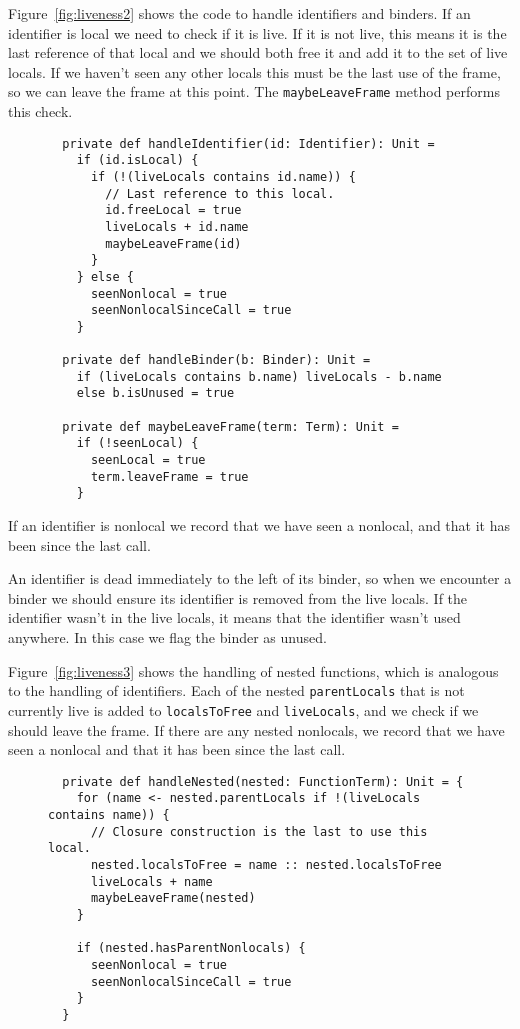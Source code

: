 Figure~\ref{fig:liveness2} shows the code to handle identifiers and binders.
If an identifier is local we need to check if it is live.
If it is not live,
this means it is the last reference of that local and we should
both free it and add it to the set of live locals.
If we haven't seen any other locals this must be the last use of the frame,
so we can leave the frame at this point.
The \verb!maybeLeaveFrame! method performs this check.

\begin{figure}
\begin{verbatim}
  private def handleIdentifier(id: Identifier): Unit =
    if (id.isLocal) {
      if (!(liveLocals contains id.name)) {
        // Last reference to this local.
        id.freeLocal = true
        liveLocals + id.name
        maybeLeaveFrame(id)
      }
    } else {
      seenNonlocal = true
      seenNonlocalSinceCall = true
    }

  private def handleBinder(b: Binder): Unit =
    if (liveLocals contains b.name) liveLocals - b.name
    else b.isUnused = true

  private def maybeLeaveFrame(term: Term): Unit =
    if (!seenLocal) {
      seenLocal = true
      term.leaveFrame = true
    }
\end{verbatim}
\getcaption
\end{figure}

If an identifier is nonlocal we record that we have seen a nonlocal,
and that it has been since the last call.

An identifier is dead immediately to the left of its binder,
so when we encounter a binder we should ensure
its identifier is removed from the live locals.
If the identifier wasn't in the live locals,
it means that the identifier wasn't used anywhere.
In this case we flag the binder as unused.

Figure~\ref{fig:liveness3} shows the handling of nested functions,
which is analogous to the handling of identifiers.
Each of the nested \verb!parentLocals! that is not currently live
is added to \verb!localsToFree! and \verb!liveLocals!,
and we check if we should leave the frame.
If there are any nested nonlocals,
we record that we have seen a nonlocal
and that it has been since the last call.

\begin{figure}
\begin{verbatim}
  private def handleNested(nested: FunctionTerm): Unit = {
    for (name <- nested.parentLocals if !(liveLocals contains name)) {
      // Closure construction is the last to use this local.
      nested.localsToFree = name :: nested.localsToFree
      liveLocals + name
      maybeLeaveFrame(nested)
    }

    if (nested.hasParentNonlocals) {
      seenNonlocal = true
      seenNonlocalSinceCall = true
    }
  }
\end{verbatim}
\getcaption
\end{figure}

